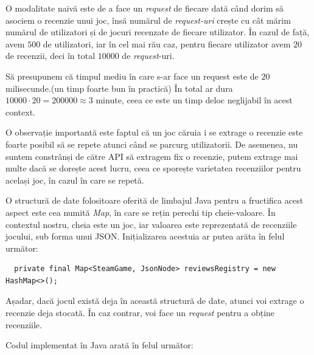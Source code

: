 \documentclass[12pt,a4paper]{report}
\begin{document}
O modalitate naivă este de a face un \emph{request} de fiecare dată când dorim să asociem o recenzie unui joc, însă numărul de \emph{request-uri} crește cu cât mărim numărul de utilizatori și de jocuri recenzate de fiecare utilizator. În cazul de față, avem \(500\) de utilizatori, iar în cel mai rău caz, pentru fiecare utilizator avem \(20\) de recenzii, deci în total \(10 000 \) de \emph{request}-uri.

Să presupunem că timpul mediu în care s-ar face un request este de \( 20 \) milisecunde.(un timp foarte bun în practică) În total ar dura \( 10 000 \cdot 20 = 200000 \approx 3 \) minute, ceea ce este un timp deloc neglijabil în acest context.

O observație importantă este faptul că un joc căruia i se extrage o recenzie este foarte posibil să se repete atunci când se parcurg utilizatorii. De asemenea, nu suntem constrânși de către API să extragem fix o recenzie, putem extrage mai multe dacă se dorește acest lucru, ceea ce sporește varietatea recenziilor pentru același joc, în cazul în care se repetă.

O structură de date folositoare oferită de limbajul Java pentru a fructifica acest aspect este cea numită \emph{Map}, în care se rețin perechi tip cheie-valoare. În contextul nostru, cheia este un joc, iar valoarea este reprezentată de recenziile jocului, sub forma unui JSON. Inițializarea acestuia ar putea arăta în felul următor:

\begin{verbatim}
  private final Map<SteamGame, JsonNode> reviewsRegistry = new HashMap<>();
\end{verbatim}

Așadar, dacă jocul există deja în această structură de date, atunci voi extrage o recenzie deja stocată. În caz contrar, voi face un \emph{request} pentru a obține recenziile.

Codul implementat în Java arată în felul următor:
\end{document}
